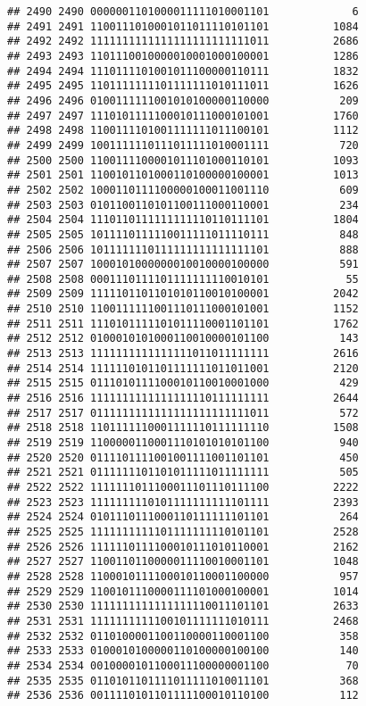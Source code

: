 \documentclass[]{article}
\begin{document}
\begin{verbatim}
## 2490 2490 0000001101000011111010001101             6
## 2491 2491 1100111010001011011110101101          1084
## 2492 2492 1111111111111111111111111011          2686
## 2493 2493 1101110010000010001000100001          1286
## 2494 2494 1110111101001011100000110111          1832
## 2495 2495 1101111111101111111010111011          1626
## 2496 2496 0100111111001010100000110000           209
## 2497 2497 1110101111100010111000101001          1760
## 2498 2498 1100111101001111111011100101          1112
## 2499 2499 1001111110111011111010001111           720
## 2500 2500 1100111100001011101000110101          1093
## 2501 2501 1100101101000110100000100001          1013
## 2502 2502 1000110111100000100011001110           609
## 2503 2503 0101100110101100111000110001           234
## 2504 2504 1110110111111111110110111101          1804
## 2505 2505 1011110111110011111011110111           848
## 2506 2506 1011111110111111111111111101           888
## 2507 2507 1000101000000010010000100000           591
## 2508 2508 0001110111101111111110010101            55
## 2509 2509 1111101101101010110010100001          2042
## 2510 2510 1100111111001110111000101001          1152
## 2511 2511 1110101111101011110001101101          1762
## 2512 2512 0100010101000110010000101100           143
## 2513 2513 1111111111111111011011111111          2616
## 2514 2514 1111110101101111111011011001          2120
## 2515 2515 0111010111100010110010001000           429
## 2516 2516 1111111111111111110111111111          2644
## 2517 2517 0111111111111111111111111011           572
## 2518 2518 1101111110001111110111111110          1508
## 2519 2519 1100000110001110101010101100           940
## 2520 2520 0111101111001001111001101101           450
## 2521 2521 0111111101101011111011111111           505
## 2522 2522 1111111011100011101110111100          2222
## 2523 2523 1111111110101111111111101111          2393
## 2524 2524 0101110111000110111111101101           264
## 2525 2525 1111111111101111111110101101          2528
## 2526 2526 1111110111100010111010110001          2162
## 2527 2527 1100110110000011110010001101          1048
## 2528 2528 1100010111100010110001100000           957
## 2529 2529 1100101110000111101000100001          1014
## 2530 2530 1111111111111111110011101101          2633
## 2531 2531 1111111111100101111111010111          2468
## 2532 2532 0110100001100110000110001100           358
## 2533 2533 0100010100000110100000100100           140
## 2534 2534 0010000101100011100000001100            70
## 2535 2535 0110101101111011111010011101           368
## 2536 2536 0011110101101111100010110100           112

\end{verbatim}
\end{document}
